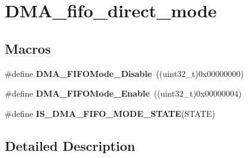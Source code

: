 \hypertarget{group___d_m_a__fifo__direct__mode}{\section{D\-M\-A\-\_\-fifo\-\_\-direct\-\_\-mode}
\label{group___d_m_a__fifo__direct__mode}
}
\subsection*{Macros}
\begin{DoxyCompactItemize}
\item 
\hypertarget{group___d_m_a__fifo__direct__mode_gadad9e503fa9867a981e3090d333483d7}{\#define {\bfseries D\-M\-A\-\_\-\-F\-I\-F\-O\-Mode\-\_\-\-Disable}~((uint32\-\_\-t)0x00000000)}\label{group___d_m_a__fifo__direct__mode_gadad9e503fa9867a981e3090d333483d7}

\item 
\hypertarget{group___d_m_a__fifo__direct__mode_ga482bc2af420602d1a8c2aa35049a3857}{\#define {\bfseries D\-M\-A\-\_\-\-F\-I\-F\-O\-Mode\-\_\-\-Enable}~((uint32\-\_\-t)0x00000004)}\label{group___d_m_a__fifo__direct__mode_ga482bc2af420602d1a8c2aa35049a3857}

\item 
\#define {\bfseries I\-S\-\_\-\-D\-M\-A\-\_\-\-F\-I\-F\-O\-\_\-\-M\-O\-D\-E\-\_\-\-S\-T\-A\-T\-E}(S\-T\-A\-T\-E)
\end{DoxyCompactItemize}


\subsection{Detailed Description}


